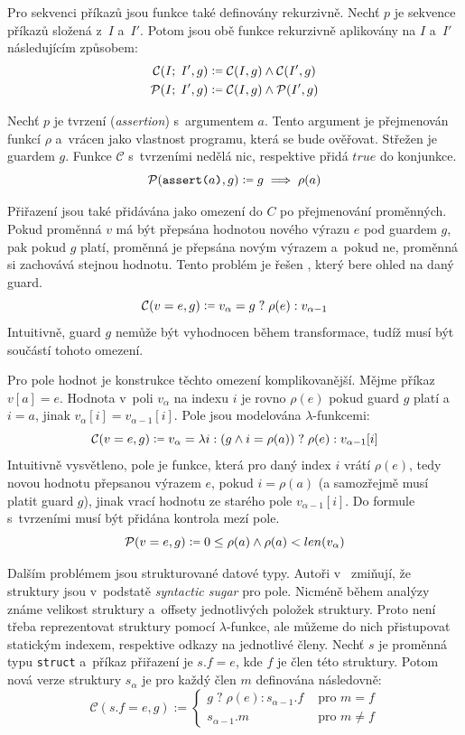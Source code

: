 \documentclass[a4paper, 11pt]{article}
\newcommand{\coloneqq}{%
  \mathrel{\mathop:\!\raisebox{0.2ex}{\scalebox{0.8}{$=$}}}
}
\begin{document}
Pro sekvenci příkazů jsou funkce také definovány rekurzivně.
Nechť $p$ je sekvence příkazů složená z~$I$ a~$I'$.
Potom jsou obě funkce rekurzivně aplikovány na $I$ a~$I'$ následujícím způsobem:
\begin{align*}
    \mathcal{C}(I;\;I', g) & \coloneqq \mathcal{C}(I, g) \land \mathcal{C}(I', g) \\
    \mathcal{P}(I;\;I', g) & \coloneqq \mathcal{C}(I, g) \land \mathcal{P}(I', g)
\end{align*}

Nechť $p$ je tvrzení (\emph{assertion}) s~argumentem $a$.
Tento argument je přejmenován funkcí $\rho$  a~vrácen jako vlastnost programu, která se bude ověřovat.
Střežen je guardem $g$.
Funkce $\mathcal{C}$ s~tvrzeními nedělá nic, respektive přidá $true$ do konjunkce.
\[
    \mathcal{P}(\texttt{assert(}a\texttt{)}, g) \coloneqq g \implies \rho(a)
\]

Přiřazení jsou také přidávána jako omezení do $C$ po přejmenování proměnných.
Pokud proměnná $v$ má být přepsána hodnotou nového výrazu $e$ pod guardem $g$, pak pokud $g$ platí, proměnná je přepsána novým výrazem a~pokud ne, proměnná si zachovává stejnou hodnotu.
Tento problém je řešen , který bere ohled na daný guard.
\[
    \mathcal{C}(v = e, g) \coloneqq v_\alpha = g \; ? \; \rho(e) : v_{\alpha-1}
\]
Intuitivně, guard $g$ nemůže být vyhodnocen během transformace, tudíž musí být součástí tohoto omezení.

Pro pole hodnot je konstrukce těchto omezení komplikovanější.
Mějme příkaz $v[a] = e$.
Hodnota v~poli $v_\alpha$ na indexu $i$ je rovno $\rho(e)$ pokud guard $g$ platí a~$i = a$, jinak $v_{\alpha}[i] = v_{\alpha - 1}[i]$.
Pole jsou modelována $\lambda$-funkcemi:
\[
    \mathcal{C}(v = e, g) \coloneqq v_\alpha = \lambda i: (g \land i = \rho(a))\; ? \; \rho(e) : v_{\alpha - 1}[i]
\]
Intuitivně vysvětleno, pole je funkce, která pro daný index $i$ vrátí $\rho(e)$, tedy novou hodnotu přepsanou výrazem $e$, pokud $i = \rho(a)$ (a samozřejmě musí platit guard $g$), jinak vrací hodnotu ze starého pole $v_{\alpha-1}[i]$.
Do formule s~tvrzeními musí být přidána kontrola mezí pole.
\[
    \mathcal{P}(v = e, g) \coloneqq 0 \leq \rho(a) \land \rho(a) < len(v_\alpha)
\]

Dalším problémem jsou strukturované datové typy.
Autoři v~\cite{kroening2016decision} zmiňují, že struktury jsou v~podstatě \emph{syntactic sugar} pro pole.
Nicméně během analýzy známe velikost struktury a~offsety jednotlivých položek struktury.
Proto není třeba reprezentovat struktury pomocí $\lambda$-funkce, ale můžeme do nich přistupovat statickým indexem, respektive odkazy na jednotlivé členy.
Nechť $s$ je proměnná typu \texttt{struct} a~příkaz přiřazení je $s.f = e$, kde $f$ je člen této struktury.
Potom nová verze struktury $s_\alpha$ je pro každý člen $m$ definována následovně:
\[
    \mathcal{C}(s.f = e, g) :=
    \begin{cases}
        g \; ? \; \rho(e) : s_{\alpha - 1}.f & \text{ pro } m = f    \\
        s_{\alpha - 1}.m                     & \text{ pro } m \neq f
    \end{cases}
\]
\end{document}
